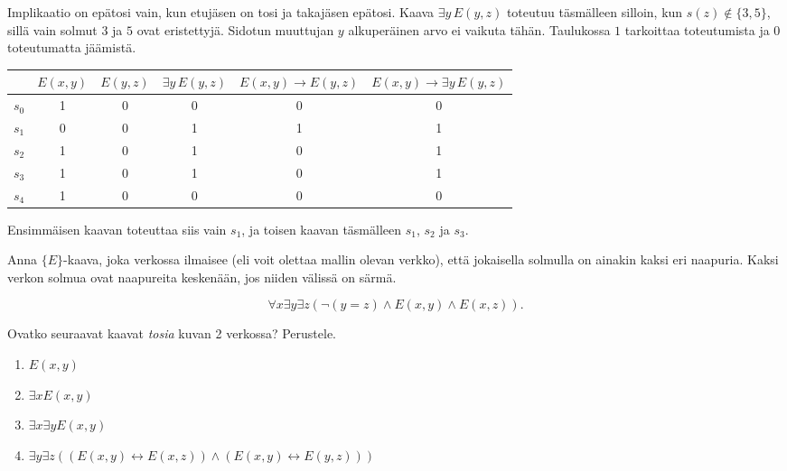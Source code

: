 \documentclass[11pt,a4paper]{amsart}
\begin{document}
\begin{solution}
  Implikaatio on epätosi vain, kun etujäsen on tosi ja takajäsen epätosi.
  Kaava \(\exists y\,E(y,z)\) toteutuu täsmälleen silloin, kun
  \(s(z)\notin\{3,5\}\), sillä vain solmut \(3\) ja \(5\) ovat
  eristettyjä. Sidotun muuttujan \(y\) alkuperäinen arvo ei vaikuta tähän.
  Taulukossa \(1\) tarkoittaa toteutumista ja \(0\) toteutumatta jäämistä.
  \begin{center}
    \renewcommand{\arraystretch}{1.15}
    \setlength{\tabcolsep}{4pt}
    \begin{tabular}{c|ccc|cc}
      & \(E(x,y)\) & \(E(y,z)\) & \(\exists y\,E(y,z)\)
      & \(E(x,y)\to E(y,z)\)
      & \(E(x,y)\to\exists y\,E(y,z)\) \\
      \hline
      \(s_0\) & 1 & 0 & 0 & 0 & 0 \\
      \(s_1\) & 0 & 0 & 1 & 1 & 1 \\
      \(s_2\) & 1 & 0 & 1 & 0 & 1 \\
      \(s_3\) & 1 & 0 & 1 & 0 & 1 \\
      \(s_4\) & 1 & 0 & 0 & 0 & 0
    \end{tabular}
  \end{center}
  Ensimmäisen kaavan toteuttaa siis vain \(s_1\), ja toisen kaavan
  täsmälleen \(s_1\), \(s_2\) ja \(s_3\).
\end{solution}

\begin{exercise}
  Anna \(\{E\}\)-kaava, joka verkossa ilmaisee (eli voit olettaa mallin olevan
  verkko), että jokaisella solmulla on ainakin kaksi eri naapuria. Kaksi verkon
  solmua ovat naapureita keskenään, jos niiden välissä on särmä.
\end{exercise}

\begin{solution}
  \[
    \forall x \exists y \exists z (\neg (y = z) \land E(x, y) \land E(x, z)).
  \]
\end{solution}

\begin{exercise}
  Ovatko seuraavat kaavat \textit{tosia} kuvan 2 verkossa? Perustele.
  \begin{enumerate}[label=(\alph*)]
    \item \(E(x,y)\)
    \item \(\exists x E(x,y)\)
    \item \(\exists x\exists y E(x,y)\)
    \item \(\exists y\exists z((E(x,y) \leftrightarrow E(x,z)) \land
      (E(x,y) \leftrightarrow E(y,z)))\)
  \end{enumerate}
\end{exercise}
\end{document}

